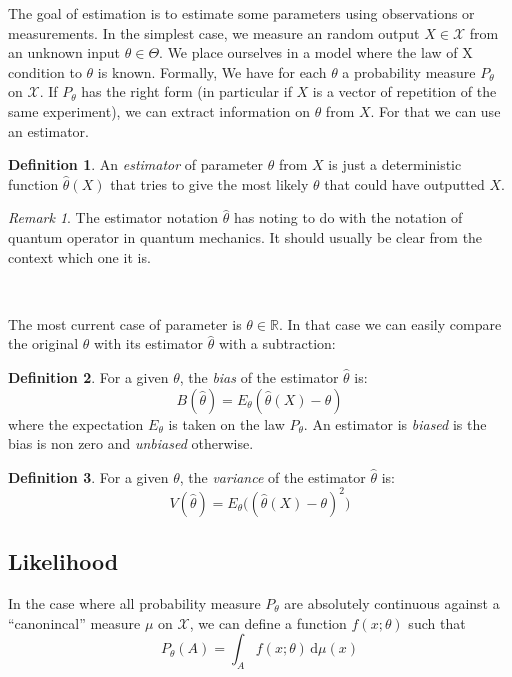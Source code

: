 \documentclass[10pt]{report}
\theoremstyle{plain}
\theoremstyle{definition}
\newtheorem{defn}{Definition}[chapter]
\theoremstyle{remark}
\newtheorem*{rem}{Remark}
\newcommand{\R}{\ensuremath{\mathbb{R}}}
\newcommand{\dd}{\mathrm{d}}
\begin{document}
The goal of estimation is to estimate some parameters using observations or
measurements. In the simplest case, we measure an random output $X \in \mathcal{X}$ from an
unknown input $\theta \in \Theta$. We place ourselves in a model where the law
of X condition to $\theta$ is known. Formally, We have for each $\theta$ a
probability measure $P_\theta$ on $\mathcal{X}$. If $P_\theta$ has the right
form (in particular if $X$ is a vector of repetition of the same experiment), we
can extract information on $\theta$ from $X$. For that we can use an estimator.

\begin{defn}
  An \emph{estimator} of parameter $\theta$ from $X$ is just a deterministic
  function $\hat \theta(X)$ that tries to give the most likely $\theta$ that
  could have outputted $X$.
\end{defn}

\begin{rem}
  The estimator notation $\hat \theta$ has noting to do with the notation of
  quantum operator in quantum mechanics. It should usually be clear from the
  context which one it is.
\end{rem}

\

The most current case of parameter is $\theta \in \R$. In that case we can
easily compare the original $\theta$ with its estimator $\hat \theta$ with a
subtraction:

\begin{defn}
  For a given $\theta$, the \emph{bias} of the estimator $\hat \theta$ is:
  \[B(\hat{\theta}) = E_\theta(\hat{\theta}(X) - \theta)\]
  where the expectation $E_\theta$ is taken on the law $P_\theta$. An estimator
  is \emph{biased} is the bias is non zero and \emph{unbiased} otherwise.
\end{defn}

\begin{defn}
  For a given $\theta$, the \emph{variance} of the estimator $\hat \theta$ is:
  \[V(\hat{\theta}) = E_\theta\Big({(\hat{\theta}(X) - \theta)}^2\Big)\]
\end{defn}

\subsection{Likelihood}

In the case where all probability measure $P_\theta$ are absolutely
continuous against a ``canonincal'' measure $\mu$ on $\mathcal{X}$, we can
define a function $f(x;\theta)$ such that
\[P_\theta(A) = \int_A f(x;\theta)\,\dd \mu(x)\]
\end{document}
